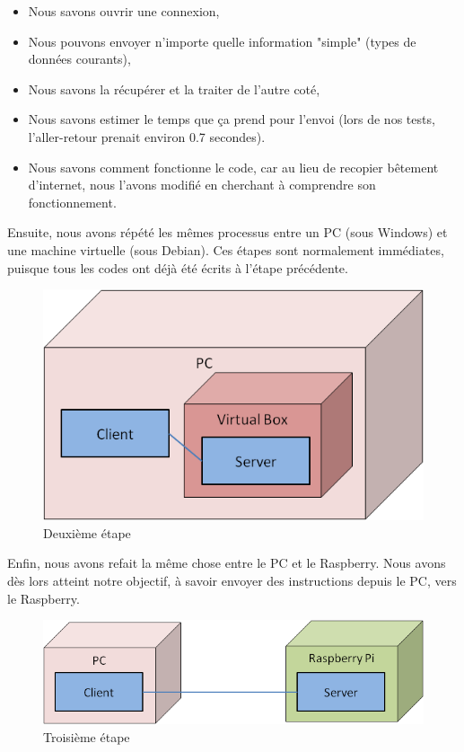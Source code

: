 \documentclass[12pt,a4paper]{report}
\begin{document}
\bigbreak

\begin{itemize}
\item Nous savons ouvrir une connexion,
\item Nous pouvons envoyer n'importe quelle information "simple" (types de données courants),
\item Nous savons la récupérer et la traiter de l'autre coté,
\item Nous savons estimer le temps que ça prend pour l'envoi (lors de nos tests, l'aller-retour prenait environ 0.7 secondes).
\item Nous savons comment fonctionne le code, car au lieu de recopier bêtement d'internet, nous l'avons modifié en cherchant à comprendre son fonctionnement.
\end{itemize}

\bigbreak

Ensuite, nous avons répété les mêmes processus entre un PC (sous Windows) et une machine virtuelle (sous Debian). Ces étapes sont normalement immédiates, puisque tous les codes ont déjà été écrits à l'étape précédente.

\begin{figure}[hf!]
\center
\includegraphics[scale=0.6]{images/Socket2.png}
\caption{Deuxième étape}
\end{figure}

\bigbreak

Enfin, nous avons refait la même chose entre le PC et le Raspberry. Nous avons dès lors atteint notre objectif, à savoir envoyer des instructions depuis le PC, vers le Raspberry.

\begin{figure}[hf!]
\center
\includegraphics[scale=0.6]{images/Socket3.png}
\caption{Troisième étape}
\end{figure}
\end{document}
